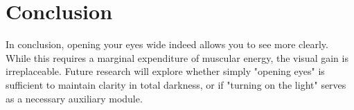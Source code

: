 \section{Conclusion}
\label{sec:conclusion}

In conclusion, opening your eyes wide indeed allows you to see more clearly. While this requires a marginal expenditure of muscular energy, the visual gain is irreplaceable. Future research will explore whether simply "opening eyes" is sufficient to maintain clarity in total darkness, or if "turning on the light" serves as a necessary auxiliary module.
